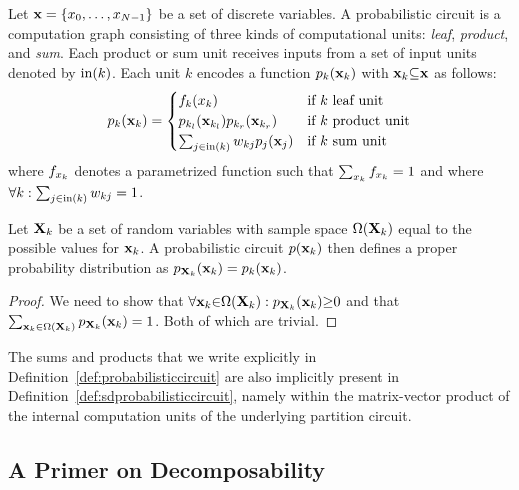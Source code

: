 \begin{definition}
	\label{def:probabilisticcircuit}
	Let   $\mathbf{x} = \{x_0, \allowbreak \dots ,\allowbreak x_{N{-}1}  \}$ be a set of discrete variables.
	A probabilistic circuit is a computation graph consisting of three kinds of computational units:
	\textit{leaf}, \textit{product}, and \textit{sum}.
	Each product or sum unit receives inputs from a set of input units denoted by $\text{in}(k)$.
	Each unit $k$ encodes a function $p_{k}(\mathbf{x}_k)$ with $\mathbf{x}_k {\subseteq} \mathbf{x}$ as follows:
	\begin{align*}
		{\ensuremath{p}}_k(\mathbf{x}_k)=
		\begin{cases}
			f_k({x_k})                                                & \text{if $k$ leaf unit}    \\
			p_{k_l}(\mathbf{x}_{k_l})  p_{k_r} (\mathbf{x}_{k_r}) & \text{if $k$ product unit} \\
			\sum_{j\in\text{in}(k)} w_{kj} p_j(\mathbf{x}_j)      & \text{if $k$ sum unit}
		\end{cases}
	\end{align*}
	where $f_{x_k}$  denotes a parametrized function such that $\sum_{x_k} f_{x_k}=1$ and where $\forall k: \sum_{j\in\text{in}(k)} w_{kj} =1$.
\end{definition}

\begin{proposition}
	Let $\mathbf{X}_k$ be a set of random variables with sample space $\Omega(\mathbf{X}_k)$ equal to the possible values for $\mathbf{x}_k$.
	A probabilistic circuit $p(\mathbf{x}_k)$ then defines a proper probability distribution as
	$
		p_{\mathbf{X}_k}(\mathbf{x}_k) = p_k (\mathbf{x}_k)
	$.
\end{proposition}

\begin{proof}
	We need to show that $\forall \mathbf{x}_k {\in} \Omega(\mathbf{X}_k): p_{\mathbf{X}_k}(\mathbf{x}_k){\geq} 0$ and that $\sum_{\mathbf{x}_k \in \Omega(\mathbf{X}_k)} p_{\mathbf{X}_k}(\mathbf{x}_k)=1$. Both of which are trivial.
\end{proof}


The sums and products that we write explicitly in Definition~\ref{def:probabilisticcircuit} are also implicitly present in Definition~\ref{def:sdprobabilisticcircuit}, namely within the matrix-vector product of the internal computation units of the underlying partition circuit.


\subsection{A Primer on Decomposability}







